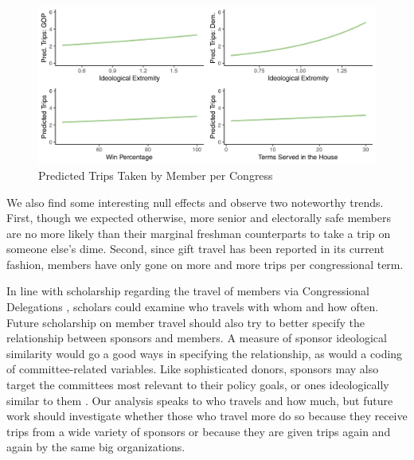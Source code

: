 \documentclass[12pt]{article}                           %
\begin{document}
\begin{figure}[hbt]
\centering
\includegraphics[scale=.6]{fig1.jpeg}
  \caption{Predicted Trips Taken by Member per Congress}
\end{figure}

We also find some interesting null effects and observe two noteworthy trends. First, though we expected otherwise, more senior and electorally safe members are no more likely than their marginal freshman counterparts to take a trip on someone else's dime. Second, since gift travel has been reported in its current fashion, members have only gone on more and more trips per congressional term.

In line with scholarship regarding the travel of members via Congressional Delegations \citep{Alduncin2014,Alduncin2017}, scholars could examine who travels with whom and how often. Future scholarship on member travel should also try to better specify the relationship between sponsors and members. A measure of sponsor ideological similarity would go a good ways in specifying the relationship, as would a coding of committee-related variables. Like sophisticated donors, sponsors may also target the committees most relevant to their policy goals, or ones ideologically similar to them \citep{Barber2017}. Our analysis speaks to who travels and how much, but future work should investigate whether those who travel more do so because they receive trips from a wide variety of sponsors or because they are given trips again and again by the same big organizations.

\newpage
\end{document}
